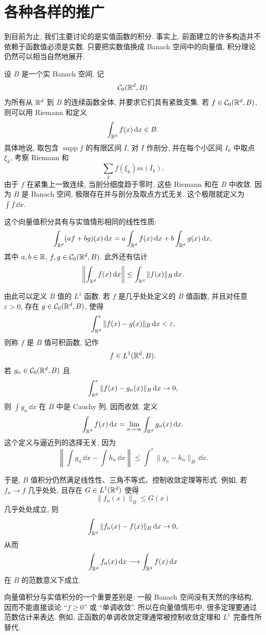 \clearpage

\section{各种各样的推广}
\label{sec:miscellaneous-generalizations}

到目前为止, 我们主要讨论的是实值函数的积分. 事实上, 前面建立的许多构造并不依赖于函数值必须是实数. 只要把实数值换成 Banach 空间中的向量值, 积分理论仍然可以相当自然地展开.

设 \(B\) 是一个实 Banach 空间. 记
\[
\mathcal{C}_0(\mathbb{R}^d,B)
\]
为所有从 \(\mathbb{R}^d\) 到 \(B\) 的连续函数全体, 并要求它们具有紧致支集. 若 \(f\in\mathcal{C}_0(\mathbb{R}^d,B)\), 则可以用 Riemann 和定义
\[
\int_{\mathbb{R}^d}f(x)\,\dd x\in B.
\]
具体地说, 取包含 \(\operatorname{supp}f\) 的有限区间 \(I\), 对 \(I\) 作剖分, 并在每个小区间 \(I_k\) 中取点 \(\xi_k\), 考察 Riemann 和
\[
\sum_k f(\xi_k)m(I_k).
\]
由于 \(f\) 在紧集上一致连续, 当剖分细度趋于零时, 这些 Riemann 和在 \(B\) 中收敛. 因为 \(B\) 是 Banach 空间, 极限存在并与剖分及取点方式无关. 这个极限就定义为 \(\int f\,\dd x\).

这个向量值积分具有与实值情形相同的线性性质:
\[
\int_{\mathbb{R}^d}(af+bg)(x)\,\dd x
=
a\int_{\mathbb{R}^d}f(x)\,\dd x
+
b\int_{\mathbb{R}^d}g(x)\,\dd x,
\]
其中 \(a,b\in\mathbb{R}\), \(f,g\in\mathcal{C}_0(\mathbb{R}^d,B)\). 此外还有估计
\[
\left\|\int_{\mathbb{R}^d}f(x)\,\dd x\right\|
\leq
\int_{\mathbb{R}^d}\|f(x)\|_B\,\dd x.
\]

由此可以定义 \(B\) 值的 \(L^1\) 函数. 若 \(f\) 是几乎处处定义的 \(B\) 值函数, 并且对任意 \(\varepsilon>0\), 存在 \(g\in\mathcal{C}_0(\mathbb{R}^d,B)\), 使得
\[
\int_{\mathbb{R}^d}^{*}\|f(x)-g(x)\|_B\,\dd x<\varepsilon,
\]
则称 \(f\) 是 \(B\) 值可积函数, 记作
\[
f\in L^1(\mathbb{R}^d,B).
\]
若 \(g_n\in\mathcal{C}_0(\mathbb{R}^d,B)\) 且
\[
\int_{\mathbb{R}^d}^{*}\|f(x)-g_n(x)\|_B\,\dd x\to0,
\]
则 \(\int g_n\,\dd x\) 在 \(B\) 中是 Cauchy 列, 因而收敛. 定义
\[
\int_{\mathbb{R}^d}f(x)\,\dd x
=
\lim_{n\to\infty}\int_{\mathbb{R}^d}g_n(x)\,\dd x.
\]
这个定义与逼近列的选择无关, 因为
\[
\left\|\int g_n\,\dd x-\int h_n\,\dd x\right\|
\leq
\int^{*}\|g_n-h_n\|_B\,\dd x.
\]

于是, \(B\) 值积分仍然满足线性性、三角不等式、控制收敛定理等形式. 例如, 若 \(f_n\to f\) 几乎处处, 且存在 \(G\in L^1(\mathbb{R}^d)\) 使得
\[
\|f_n(x)\|_B\leq G(x)
\]
几乎处处成立, 则
\[
\int_{\mathbb{R}^d}\|f_n(x)-f(x)\|_B\,\dd x\to0,
\]
从而
\[
\int_{\mathbb{R}^d}f_n(x)\,\dd x
\longrightarrow
\int_{\mathbb{R}^d}f(x)\,\dd x
\]
在 \(B\) 的范数意义下成立.

\begin{rem}
	向量值积分与实值积分的一个重要差别是: 一般 Banach 空间没有天然的序结构, 因而不能直接谈论 ``\(f\geq0\)'' 或 ``单调收敛''. 所以在向量值情形中, 很多定理要通过范数估计来表达. 例如, 正函数的单调收敛定理通常被控制收敛定理和 \(L^1\) 完备性所替代.
\end{rem}

